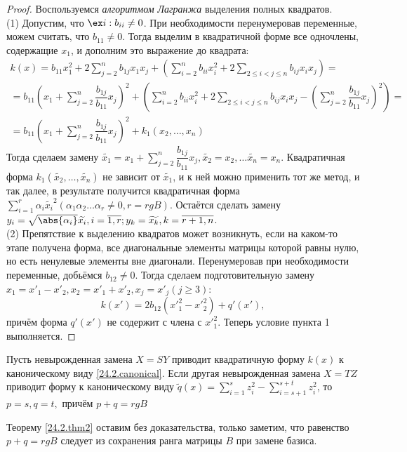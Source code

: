   \begin{proof} Воспользуемся \textit{алгоритмом Лагранжа} выделения полных квадратов.\\
  (1) Допустим,	что $\ex i: b_{ii} \neq 0$. При 	необходимости перенумеровав переменные, можем считать, что $b_{11} \neq 0$. Тогда выделим в квадратичной форме все одночлены, содержащие $x_1$, и дополним это выражение до квадрата:
  \begin{equation*}\begin{array}{crl}
  k(x)=b_{11}x_1^2+2\sum\limits_{j=2}^nb_{1j}x_1x_j+(\sum\limits_{i=2}^nb_{ii}x_i^2+2\sum\limits_{2\le i<j\le n} b_{ij}x_ix_j)=\\
  =b_{11}(x_1+\sum\limits_{j=2}^n\dfrac{b_{1j}}{b_{11}}x_j)^2+(\sum\limits_{i=2}^nb_{ii}x_i^2+2\sum\limits_{2\le i<j\le n} b_{ij}x_ix_j-(\sum\limits_{j=2}^n\dfrac{b_{1j}}{b_{11}}x_j)^2)=\\
  =b_{11}(x_1+\sum\limits_{j=2}^n\dfrac{b_{1j}}{b_{11}}x_j)^2+k_1(x_2,\ldots, x_n)
  \end{array}\end{equation*}
  Тогда сделаем замену $\widetilde{x_1}=x_1+\sum\limits_{j=2}^n\dfrac{b_{1j}}{b_{11}}x_j, \widetilde{x_2}=x_2,\ldots \widetilde{x_n}=x_n$. Квадратичная форма $k_1(\widetilde{x_2},\ldots, \widetilde{x_n})$ не зависит от $\widetilde{x_1}$, и к ней можно применить тот же метод, и так далее, в результате получится квадратичная форма $\sum\limits_{i=1}^r\alpha_i\widetilde{x_i}^2 (\alpha_1\alpha_2\ldots\alpha_r \neq 0, r=rg B)$. Остаётся сделать замену $y_i=\sqrt{\abs{\alpha_i}}\widetilde{x_i}, i=\overline{1,r}; y_k=\widetilde{x_k}, k=\overline{r+1,n}$.\\
  (2) Препятствие к выделению квадратов может возникнуть, если на каком-то этапе получена форма, все диагональные элементы матрицы которой равны нулю, но есть ненулевые элементы вне диагонали. Перенумеровав при необходимости переменные, добьёмся $b_{12} \neq 0$. Тогда сделаем подготовительную замену $x_1=x'_1-x'_2,x_2=x'_1+x'_2,x_j=x'_j (j \ge 3)$:
  \begin{equation*}
  k(x')=2b_{12}({x'}_1^2-{x'}_2^2)+q'(x'),
  \end{equation*}
  причём форма $q'(x')$ не содержит с члена с ${x'}_1^2$. Теперь условие пункта 1 выполняется.
  \end{proof}
  
  \begin{thm}\label{24.2.thm2}
  Пусть невырожденная замена $X=SY$ приводит квадратичную форму $k(x)$ к каноническому виду \ref{24.2.canonical}. Если другая невырожденная замена $X=TZ$ приводит форму к каноническому виду $\widetilde q(x)=\sum\limits_{i=1}^sz_i^2-\sum\limits_{i=s+1}^{s+t}z_i^2$, то $p=s,q=t,$ причём $p+q=rg B$
  \end{thm} 
  Теорему \ref{24.2.thm2} оставим без доказательства, только заметим, что равенство $p+q=rg B$ следует из сохранения ранга матрицы $B$ при замене базиса.